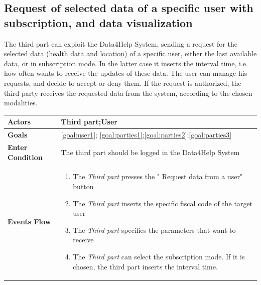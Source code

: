  \subsection{Request of selected data of a specific user with subscription, and data visualization}
 
The third part can exploit the Data4Help System, sending a request for the selected data (health data and location) of a specific user, either the last available data, or in subscription mode.  
 In the latter case  it inserts the interval time, i.e. how often wants to receive the updates of these data.
The user can manage his requests, and decide to accept or deny them. If the request is authorized, the third party receives the requested data from the system, according to the chosen modalities.

\begin{table}[H]
	\centering
    
    \begin{tabular}{|p{3.5cm}|p{10.3cm}|}
    
    \hline
    \textbf{\large{Actors}}  			& \tabitem Third part;\tabitem  User  									\\
    				 			
    \hline
    \textbf{\large{Goals}} 				&\ref{goal:user1}; \ref{goal:parties1};\ref{goal:parties2};\ref{goal:parties3}\\
    
    \hline
    \textbf{\large{Enter Condition}} & The third part should be logged in the Data4Help System	\\
    
    \hline
    \textbf{\large{Events Flow}}		& \begin{enumerate}[leftmargin=0.5cm]
                                          	\item The \emph{Third part}  presses the " Request data  from a user" button
                                            \item The \emph{Third part} inserts the specific fiscal code of the target user
                                            \item The \emph{Third part} specifies the parameters that want to receive
                                            
                                            \item The \emph{Third part} can select the subscription mode. If 
                            it is chosen, the third part inserts the interval time. 
                            

\end{enumerate}
\end{tabular}
\end{table}
